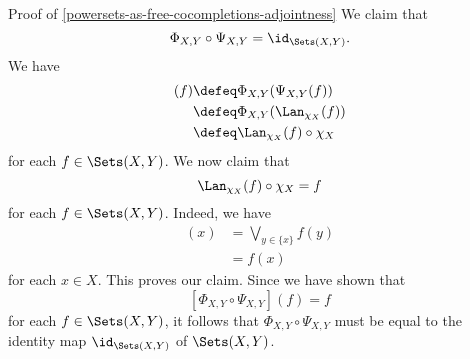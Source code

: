 \begin{Proof}{Proof of \cref{powersets-as-free-cocompletions-adjointness}}
    We claim that
    \[
        \Phi_{X,Y}\circ\Psi_{X,Y}%
        =%
        \id_{\Sets(X,Y)}.%
    \]%
    We have
    \begin{align*}
        [\Phi_{X,Y}\circ\Psi_{X,Y}](f) &\defeq  \Phi_{X,Y}(\Psi_{X,Y}(f))\\%
                                       &\defeq  \Phi_{X,Y}(\Lan_{\chi_{X}}(f))\\%
                                       &\defeq  \Lan_{\chi_{X}}(f)\circ\chi_{X}%
    \end{align*}
    for each $f\in\Sets(X,Y)$. We now claim that
    \[
        \Lan_{\chi_{X}}(f)\circ\chi_{X}%
        =%
        f%
    \]%
    for each $f\in\Sets(X,Y)$. Indeed, we have
    \begin{align*}
        [\Lan_{\chi_{X}}(f)\circ\chi_{X}](x) &= \bigvee_{y\in\{x\}}f(y)\\%
                                             &= f(x)%
    \end{align*}
    for each $x\in X$. This proves our claim. Since we have shown that
    \[
        [\Phi_{X,Y}\circ\Psi_{X,Y}](f)%
        =%
        f%
    \]%
    for each $f\in\Sets(X,Y)$, it follows that $\Phi_{X,Y}\circ\Psi_{X,Y}$ must be equal to the identity map $\id_{\Sets(X,Y)}$ of $\Sets(X,Y)$.


\end{Proof}
